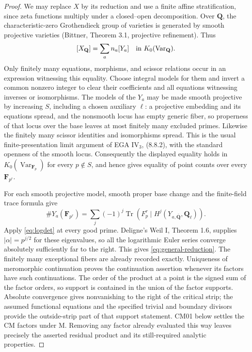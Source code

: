 \documentclass[11pt,a4paper]{article}
\theoremstyle{definition}
\begin{document}
\begin{proof}
We may replace $X$ by its reduction and use a finite affine
stratification, since zeta functions multiply under a closed--open
decomposition.  Over $\mathbf Q$, the characteristic-zero
Grothendieck group of varieties is generated by smooth projective
varieties (Bittner, Theorem 3.1, projective refinement).  Thus
\[
 [X_{\mathbf Q}]=\sum_a n_a[Y_a]\quad\hbox{in }K_0(\operatorname{Var}_{\mathbf Q}).
\]
Only finitely many equations, morphisms, and scissor relations occur
in an expression witnessing this equality.  Choose integral models
for them and invert a common nonzero integer to clear their
coefficients and all equations witnessing inverses or isomorphisms.
The models of the $Y_a$ may be made smooth projective by increasing
$S$, including a chosen auxiliary $\ell$: a projective embedding
and its equations spread, and the
nonsmooth locus has empty generic fiber, so properness of that
locus over the base leaves at most finitely many excluded primes.
Likewise the finitely many scissor identities and isomorphisms
spread.  This is the usual finite-presentation limit argument of
EGA IV$_3$, (8.8.2), with the standard openness of the smooth locus.
Consequently the displayed equality holds in
$K_0(\operatorname{Var}_{\mathbf F_p})$ for every $p\notin S$,
and hence gives equality of point counts over every
$\mathbf F_{p^r}$.

For each smooth projective model, smooth proper base change and
the finite-field trace formula give
\[
 \#Y_a(\mathbf F_{p^r})
 =\sum_j(-1)^j\operatorname{Tr}(F_p^r\mid H^j(Y_{a,\overline{\mathbf Q}},
                                             \mathbf Q_\ell)).
\]
Apply \eqref{eq:logdet} at every good prime.  Deligne's Weil I,
Theorem 1.6, supplies $|\alpha|=p^{j/2}$ for these eigenvalues,
so all the logarithmic Euler series converge absolutely sufficiently
far to the right.  This gives \eqref{eq:general-reduction}.
The finitely many exceptional fibers are already recorded exactly.
Uniqueness of meromorphic continuation proves the continuation
assertion whenever its factors have such continuations.  The order
of the product at a point is the signed sum of the factor orders,
so support is contained in the union of the factor supports.
Absolute convergence gives nonvanishing to the right of the
critical strip; the assumed functional equations and the specified
trivial and boundary divisors provide the outside-strip part of
that support statement.
CM01 below settles the CM factors under M.  Removing any factor
already evaluated this way leaves precisely the asserted residual
product and its still-required analytic properties.
\end{proof}
\end{document}
